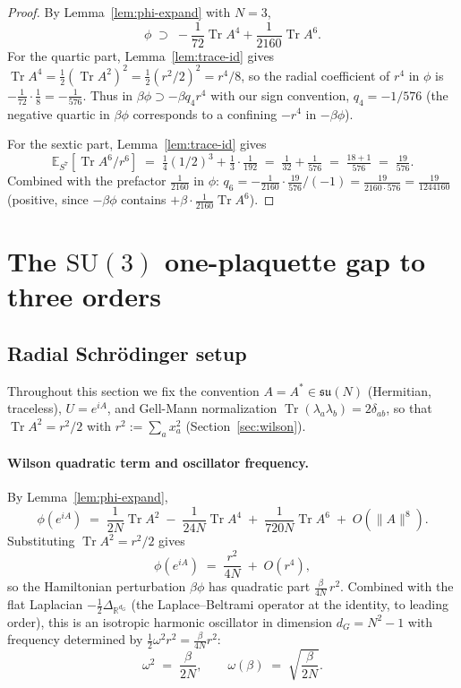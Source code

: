 \documentclass[11pt,a4paper]{article}
\theoremstyle{definition}
\newcommand{\SU}{\mathrm{SU}}
\newcommand{\Tr}{\operatorname{Tr}}
\newcommand{\E}{\mathbb{E}}
\newcommand{\R}{\mathbb{R}}
\begin{document}
\begin{proof}
By Lemma~\ref{lem:phi-expand} with $N=3$,
\[
\phi \;\supset\; -\frac{1}{72}\Tr A^4 + \frac{1}{2160}\Tr A^6.
\]
For the quartic part, Lemma~\ref{lem:trace-id} gives
$\Tr A^4 = \tfrac{1}{2}(\Tr A^2)^2 = \tfrac{1}{2}(r^2/2)^2 = r^4/8$,
so the radial coefficient of $r^4$ in $\phi$ is $-\tfrac{1}{72}\cdot
\tfrac{1}{8} = -\tfrac{1}{576}$. Thus in
$\beta\phi \supset -\beta q_4 r^4$ with our sign convention,
$q_4 = -1/576$ (the negative quartic in $\beta\phi$ corresponds to
a confining $-r^4$ in $-\beta\phi$).

For the sextic part, Lemma~\ref{lem:trace-id} gives
\[
\E_{S^7}[\Tr A^6/r^6]
\;=\;
\tfrac{1}{4}(1/2)^3 + \tfrac{1}{3}\cdot\tfrac{1}{192}
\;=\;
\tfrac{1}{32} + \tfrac{1}{576}
\;=\;
\tfrac{18+1}{576}
\;=\;
\tfrac{19}{576}.
\]
Combined with the prefactor $\tfrac{1}{2160}$ in $\phi$:
$q_6 = -\tfrac{1}{2160}\cdot\tfrac{19}{576}/(-1) = \tfrac{19}{2160\cdot 576}
= \tfrac{19}{1244160}$ (positive, since $-\beta\phi$ contains
$+\beta\cdot\tfrac{1}{2160}\Tr A^6$).
\end{proof}

\section{The $\SU(3)$ one-plaquette gap to three orders}\label{sec:su3}

\subsection{Radial Schr\"odinger setup}\label{ssec:radial-setup}

Throughout this section we fix the convention $A=A^\ast\in\mathfrak{su}(N)$
(Hermitian, traceless), $U=e^{iA}$, and Gell-Mann normalization
$\Tr(\lambda_a\lambda_b)=2\delta_{ab}$, so that $\Tr A^2 = r^2/2$ with
$r^2 := \sum_a x_a^2$ (Section~\ref{sec:wilson}).

\paragraph{Wilson quadratic term and oscillator frequency.}
By Lemma~\ref{lem:phi-expand},
\[
\phi(e^{iA}) \;=\; \frac{1}{2N}\Tr A^2 \;-\; \frac{1}{24N}\Tr A^4
\;+\;\frac{1}{720N}\Tr A^6 \;+\;O(\|A\|^8).
\]
Substituting $\Tr A^2 = r^2/2$ gives
\[
\phi(e^{iA}) \;=\; \frac{r^2}{4N} \;+\; O(r^4),
\]
so the Hamiltonian perturbation $\beta\phi$ has quadratic part
$\frac{\beta}{4N}\,r^2$. Combined with the flat Laplacian
$-\frac{1}{2}\Delta_{\R^{d_G}}$ (the Laplace--Beltrami operator at the
identity, to leading order), this is an isotropic harmonic oscillator
in dimension $d_G = N^2-1$ with frequency determined by
$\tfrac{1}{2}\omega^2 r^2 = \tfrac{\beta}{4N} r^2$:
\begin{equation}\label{eq:omega-correct}
\omega^2 \;=\; \frac{\beta}{2N},
\qquad
\omega(\beta) \;=\; \sqrt{\frac{\beta}{2N}}.
\end{equation}
\end{document}
